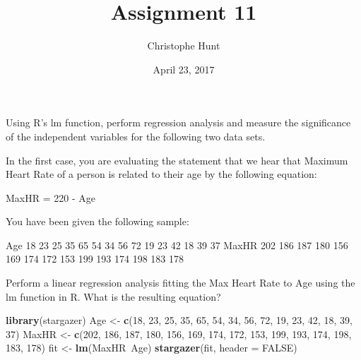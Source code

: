 \documentclass[]{article}
\title{Assignment 11}
\author{Christophe Hunt}
\date{April 23, 2017}
\newenvironment{Shaded}{\begin{snugshade}}{\end{snugshade}}
\newcommand{\KeywordTok}[1]{\textcolor[rgb]{0.13,0.29,0.53}{\textbf{{#1}}}}
\newcommand{\DataTypeTok}[1]{\textcolor[rgb]{0.13,0.29,0.53}{{#1}}}
\newcommand{\DecValTok}[1]{\textcolor[rgb]{0.00,0.00,0.81}{{#1}}}
\newcommand{\StringTok}[1]{\textcolor[rgb]{0.31,0.60,0.02}{{#1}}}
\newcommand{\OtherTok}[1]{\textcolor[rgb]{0.56,0.35,0.01}{{#1}}}
\newcommand{\NormalTok}[1]{{#1}}
\begin{document}
\maketitle

{
\setcounter{tocdepth}{2}
\tableofcontents
}
Using R's lm function, perform regression analysis and measure the
significance of the independent variables for the following two data
sets.

In the first case, you are evaluating the statement that we hear that
Maximum Heart Rate of a person is related to their age by the following
equation:

MaxHR = 220 - Age

You have been given the following sample:

Age 18 23 25 35 65 54 34 56 72 19 23 42 18 39 37 \newline
MaxHR 202 186 187 180 156 169 174 172 153 199 193 174 198 183 178

Perform a linear regression analysis fitting the Max Heart Rate to Age
using the lm function in R. What is the resulting equation?

\begin{Shaded}
\begin{Highlighting}[]
\KeywordTok{library}\NormalTok{(stargazer)}
\NormalTok{Age <-}\StringTok{ }\KeywordTok{c}\NormalTok{(}\DecValTok{18}\NormalTok{, }\DecValTok{23}\NormalTok{, }\DecValTok{25}\NormalTok{, }\DecValTok{35}\NormalTok{, }\DecValTok{65}\NormalTok{, }\DecValTok{54}\NormalTok{, }\DecValTok{34}\NormalTok{, }\DecValTok{56}\NormalTok{, }\DecValTok{72}\NormalTok{, }\DecValTok{19}\NormalTok{, }\DecValTok{23}\NormalTok{, }\DecValTok{42}\NormalTok{, }\DecValTok{18}\NormalTok{, }\DecValTok{39}\NormalTok{, }\DecValTok{37}\NormalTok{)}
\NormalTok{MaxHR <-}\StringTok{ }\KeywordTok{c}\NormalTok{(}\DecValTok{202}\NormalTok{, }\DecValTok{186}\NormalTok{, }\DecValTok{187}\NormalTok{, }\DecValTok{180}\NormalTok{, }\DecValTok{156}\NormalTok{, }\DecValTok{169}\NormalTok{, }\DecValTok{174}\NormalTok{, }\DecValTok{172}\NormalTok{, }\DecValTok{153}\NormalTok{, }\DecValTok{199}\NormalTok{, }\DecValTok{193}\NormalTok{, }\DecValTok{174}\NormalTok{, }\DecValTok{198}\NormalTok{, }\DecValTok{183}\NormalTok{, }\DecValTok{178}\NormalTok{)}
\NormalTok{fit <-}\StringTok{ }\KeywordTok{lm}\NormalTok{(MaxHR~Age)}
\KeywordTok{stargazer}\NormalTok{(fit, }\DataTypeTok{header =} \OtherTok{FALSE}\NormalTok{)}
\end{Highlighting}
\end{Shaded}
\end{document}
